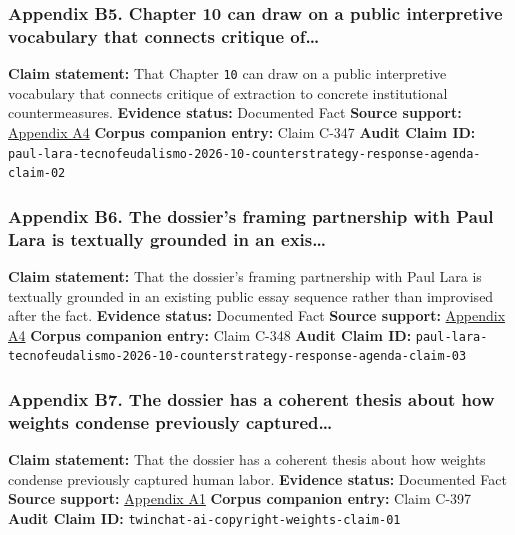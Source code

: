 \documentclass[
  american,
  11pt,
  letterpaper,
]{article}
\begin{document}
\subsubsection{Appendix B5. Chapter 10 can draw on a public interpretive
vocabulary that connects critique
of\ldots{}}\label{ch-00-appendix-b5-chapter-10-can-draw-on-a-public-interpretive-vocabulary-that-connects-critique-of}

\textbf{Claim statement:} That Chapter \texttt{10} can draw on a public
interpretive vocabulary that connects critique of extraction to concrete
institutional countermeasures. \textbf{Evidence status:} Documented Fact
\textbf{Source support:}
\hyperref[ch-00-appendix-a4-c-mo-hackear-al-tecnofeudalismo]{Appendix
A4} \textbf{Corpus companion entry:} Claim C-347 \textbf{Audit Claim
ID:}
\texttt{paul-lara-tecnofeudalismo-2026-10-counterstrategy-response-agenda-claim-02}

\subsubsection{Appendix B6. The dossier's framing partnership with Paul
Lara is textually grounded in an
exis\ldots{}}\label{ch-00-appendix-b6-the-dossier-s-framing-partnership-with-paul-lara-is-textually-grounded-in-an-exis}

\textbf{Claim statement:} That the dossier's framing partnership with
Paul Lara is textually grounded in an existing public essay sequence
rather than improvised after the fact. \textbf{Evidence status:}
Documented Fact \textbf{Source support:}
\hyperref[ch-00-appendix-a4-c-mo-hackear-al-tecnofeudalismo]{Appendix
A4} \textbf{Corpus companion entry:} Claim C-348 \textbf{Audit Claim
ID:}
\texttt{paul-lara-tecnofeudalismo-2026-10-counterstrategy-response-agenda-claim-03}

\subsubsection{Appendix B7. The dossier has a coherent thesis about how
weights condense previously
captured\ldots{}}\label{ch-00-appendix-b7-the-dossier-has-a-coherent-thesis-about-how-weights-condense-previously-captured}

\textbf{Claim statement:} That the dossier has a coherent thesis about
how weights condense previously captured human labor. \textbf{Evidence
status:} Documented Fact \textbf{Source support:}
\hyperref[ch-00-appendix-a1-ai-copyright-weights-a-new-frontier-in-intellectual-property-law]{Appendix
A1} \textbf{Corpus companion entry:} Claim C-397 \textbf{Audit Claim
ID:} \texttt{twinchat-ai-copyright-weights-claim-01}
\end{document}
